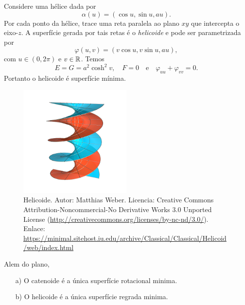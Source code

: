 \begin{exemplo}
	Considere uma hélice dada por
	\begin{equation*}
	\alpha(u) = \left( \cos u, \sin u, au \right).
	\end{equation*}
	Por cada ponto da hélice, trace uma reta paralela ao plano $xy$ que intercepta o eixo-$z$.
	A superfície gerada por tais retas é o \emph{helicoide} e pode ser parametrizada por
	\begin{equation*}
	\varphi(u,v) = \left( v \cos u, v \sin u, au \right),
	\end{equation*}
	com $u \in (0, 2 \pi)$ e $v \in \mathbb{R}$. Temos
	\begin{equation*}
	E = G = a^2 \cosh^2 v, \quad F = 0 \quad \text{e} \quad \varphi_{uu} + \varphi_{vv} = 0.
	\end{equation*}
	Portanto o helicoide é superfície mínima.
\end{exemplo}

\begin{figure}
	\centering
	\includegraphics[width=0.5\textwidth]{images/helicoid}
	\caption{Helicoide. Autor: Matthias Weber. Licencia: Creative Commons Attribution-Noncommercial-No Derivative Works 3.0 Unported License (\url{http://creativecommons.org/licenses/by-nc-nd/3.0/}). Enlace: \url{https://minimal.sitehost.iu.edu/archive/Classical/Classical/Helicoid/web/index.html}}
\end{figure}

\begin{teorema}
	Alem do plano,
	\begin{enumerate}
		\item[a)] O catenoide é a única superfície rotacional minima.
		\item[b)] O helicoide é a única superfície regrada minima.
	\end{enumerate}
\end{teorema}

